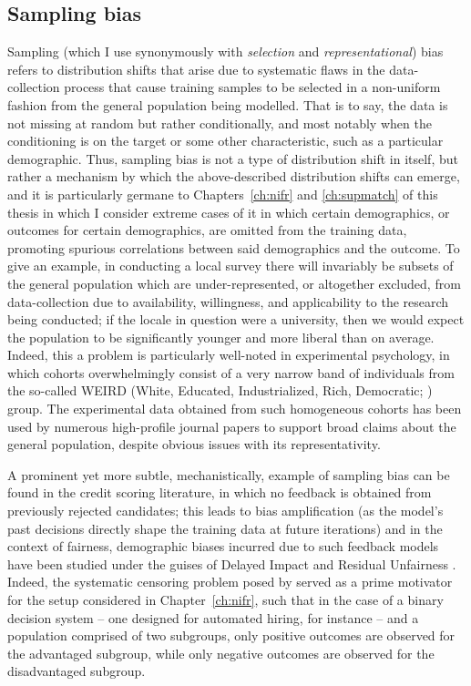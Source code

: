 \subsection{Sampling bias}\label{ssec:sampling-bias}
Sampling (which I use synonymously with \emph{selection} and \emph{representational}) bias refers
to distribution shifts that arise due to systematic flaws in the data-collection process that cause
training samples to be selected in a non-uniform fashion from the general population being
modelled.
%
That is to say, the data is not missing at random but rather conditionally, and most notably when
the conditioning is on the target or some other characteristic, such as a particular demographic.
%
Thus, sampling bias is not a type of distribution shift in itself, but rather a mechanism by which
the above-described distribution shifts can emerge, and it is particularly germane to
Chapters~\ref{ch:nifr} and \ref{ch:supmatch} of this thesis in which I consider extreme cases of
it in which certain demographics, or outcomes for certain demographics, are omitted from the
training data, promoting spurious correlations between said demographics and the outcome.
%
To give an example, in conducting a local survey there will invariably be subsets of the general
population which are under-represented, or altogether excluded, from data-collection due to
availability, willingness, and applicability to the research being conducted; if the locale in
question were a university, then we would expect the population to be significantly younger and
more liberal than on average.
%
Indeed, this a problem is particularly well-noted in experimental psychology, in which cohorts
overwhelmingly consist of a very narrow band of individuals from the so-called WEIRD (White,
Educated, Industrialized, Rich, Democratic; \citet{henrich2010weirdest}) group.
%
The experimental data obtained from such homogeneous cohorts has been used by numerous high-profile
journal papers to support broad claims about the general population, despite obvious issues with
its representativity.

%
A prominent yet more subtle, mechanistically, example of sampling bias can be found in the credit
scoring literature, in which no feedback is obtained from previously rejected candidates; this
leads to bias amplification (as the model's past decisions directly shape the training data at
future iterations) and in the context of fairness, demographic biases incurred due to such feedback
models have been studied under the guises of Delayed Impact \citep{liu2018delayed} and Residual
Unfairness \citep{kallus2018residual}.
%
Indeed, the systematic censoring problem posed by \cite{kallus2018residual} served as a prime
motivator for the setup considered in Chapter~\ref{ch:nifr}, such that in the case of a binary
decision system -- one designed for automated hiring, for instance -- and a population comprised of
two subgroups, only positive outcomes are observed for the advantaged subgroup, while only negative
outcomes are observed for the disadvantaged subgroup.
%
